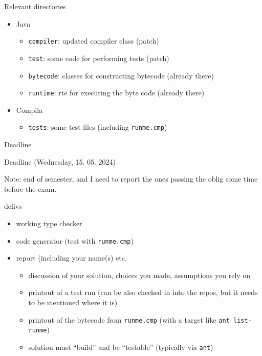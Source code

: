 \documentclass{beamer}
\begin{document}
\begin{frame}[label={sec:org355e2f4},fragile]{Relevant directories}
 \begin{itemize}
\item Java

\begin{itemize}
\item \texttt{compiler}: updated compiler class (patch)
\item \texttt{test}:   some code for performing tests (patch)
\item \texttt{bytecode}: classes for constructing bytecode (already there)
\item \texttt{runtime}: rte for executing the byte code (already there)
\end{itemize}

\item Compila

\begin{itemize}
\item \texttt{tests}: some test files (including \texttt{runme.cmp})
\end{itemize}
\end{itemize}
\end{frame}
\begin{frame}[label={sec:org4e6ce35},fragile]{Deadline}
 \begin{alertblock}{Deadline}
   (Wednesday, 15. 05. 2024)
\end{alertblock}
Note: end of semester, and I need to report the ones passing the oblig some
time before the exam.
\begin{block}{delivs}
\begin{itemize}
\item working type checker
\item code generator (test with \texttt{runme.cmp})
\item report (including your name(s) etc.

\begin{itemize}
\item discussion of your solution, choices you made, assumptions you rely on

\item printout of a test run (can be also checked in into the repos, but it 
needs to be mentioned where it is)
\item printout of the bytecode from \texttt{runme.cmp} (with a target like \texttt{ant
    list-runme})

\item solution must ``build'' and be ``testable'' (typically via \texttt{ant})
\end{itemize}
\end{itemize}
\end{block}
\end{frame}

\end{document}
